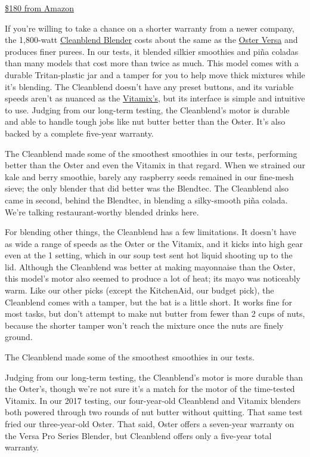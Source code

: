 \href{https://www.nytimes3xbfgragh.onion/wirecutter/out/link/8947/25620/4/109196?merchant=Amazon}{\$180
from Amazon}

If you're willing to take a chance on a shorter warranty from a newer
company, the 1,800-watt
\href{https://www.nytimes3xbfgragh.onion/wirecutter/out/link/8947/25620/4/69781/?merchant=Amazon}{Cleanblend
Blender} costs about the same as the
\protect\hyperlink{runner-up-oster-versa-pro-series-blender}{Oster
Versa} and produces finer purees. In our tests, it blended silkier
smoothies and piña coladas than many models that cost more than twice as
much. This model comes with a durable Tritan-plastic jar and a tamper
for you to help move thick mixtures while it's blending. The Cleanblend
doesn't have any preset buttons, and its variable speeds aren't as
nuanced as the \protect\hyperlink{our-pick-vitamix-5200}{Vitamix's}, but
its interface is simple and intuitive to use. Judging from our long-term
testing, the Cleanblend's motor is durable and able to handle tough jobs
like nut butter better than the Oster. It's also backed by a complete
five-year warranty.

The Cleanblend made some of the smoothest smoothies in our tests,
performing better than the Oster and even the Vitamix in that regard.
When we strained our kale and berry smoothie, barely any raspberry seeds
remained in our fine-mesh sieve; the only blender that did better was
the Blendtec. The Cleanblend also came in second, behind the Blendtec,
in blending a silky-smooth piña colada. We're talking restaurant-worthy
blended drinks here.

For blending other things, the Cleanblend has a few limitations. It
doesn't have as wide a range of speeds as the Oster or the Vitamix, and
it kicks into high gear even at the 1 setting, which in our soup test
sent hot liquid shooting up to the lid. Although the Cleanblend was
better at making mayonnaise than the Oster, this model's motor also
seemed to produce a lot of heat; its mayo was noticeably warm. Like our
other picks (except the KitchenAid, our budget pick), the Cleanblend
comes with a tamper, but the bat is a little short. It works fine for
most tasks, but don't attempt to make nut butter from fewer than 2 cups
of nuts, because the shorter tamper won't reach the mixture once the
nuts are finely ground.

The Cleanblend made some of the smoothest smoothies in our tests.

Judging from our long-term testing, the Cleanblend's motor is more
durable than the Oster's, though we're not sure it's a match for the
motor of the time-tested Vitamix. In our 2017 testing, our four-year-old
Cleanblend and Vitamix blenders both powered through two rounds of nut
butter without quitting. That same test fried our three-year-old Oster.
That said, Oster offers a seven-year warranty on the Versa Pro Series
Blender, but Cleanblend offers only a five-year total warranty.

